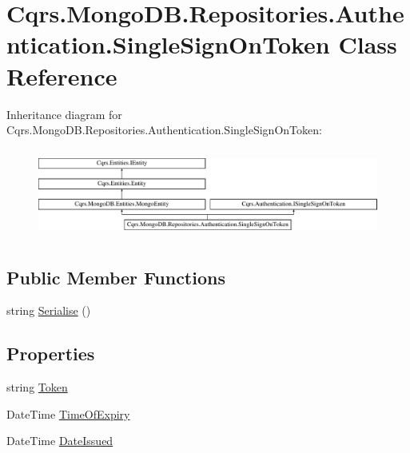 \hypertarget{classCqrs_1_1MongoDB_1_1Repositories_1_1Authentication_1_1SingleSignOnToken}{}\section{Cqrs.\+Mongo\+D\+B.\+Repositories.\+Authentication.\+Single\+Sign\+On\+Token Class Reference}
\label{classCqrs_1_1MongoDB_1_1Repositories_1_1Authentication_1_1SingleSignOnToken}
Inheritance diagram for Cqrs.\+Mongo\+D\+B.\+Repositories.\+Authentication.\+Single\+Sign\+On\+Token\+:\begin{figure}[H]
\begin{center}
\leavevmode
\includegraphics[height=2.962963cm]{classCqrs_1_1MongoDB_1_1Repositories_1_1Authentication_1_1SingleSignOnToken}
\end{center}
\end{figure}
\subsection*{Public Member Functions}
\begin{DoxyCompactItemize}
\item 
string \hyperlink{classCqrs_1_1MongoDB_1_1Repositories_1_1Authentication_1_1SingleSignOnToken_a2392ecdb53f1f2a38a67d80a77f11ba4_a2392ecdb53f1f2a38a67d80a77f11ba4}{Serialise} ()
\end{DoxyCompactItemize}
\subsection*{Properties}
\begin{DoxyCompactItemize}
\item 
string \hyperlink{classCqrs_1_1MongoDB_1_1Repositories_1_1Authentication_1_1SingleSignOnToken_abf59456bf30dd139620ed6de3ee11e74_abf59456bf30dd139620ed6de3ee11e74}{Token}
\item 
Date\+Time \hyperlink{classCqrs_1_1MongoDB_1_1Repositories_1_1Authentication_1_1SingleSignOnToken_ab91868f3fc18e2369131ab931e04cacc_ab91868f3fc18e2369131ab931e04cacc}{Time\+Of\+Expiry}
\item 
Date\+Time \hyperlink{classCqrs_1_1MongoDB_1_1Repositories_1_1Authentication_1_1SingleSignOnToken_acf0a5524d873b709b3955374ec6cc76d_acf0a5524d873b709b3955374ec6cc76d}{Date\+Issued}
\end{DoxyCompactItemize}



